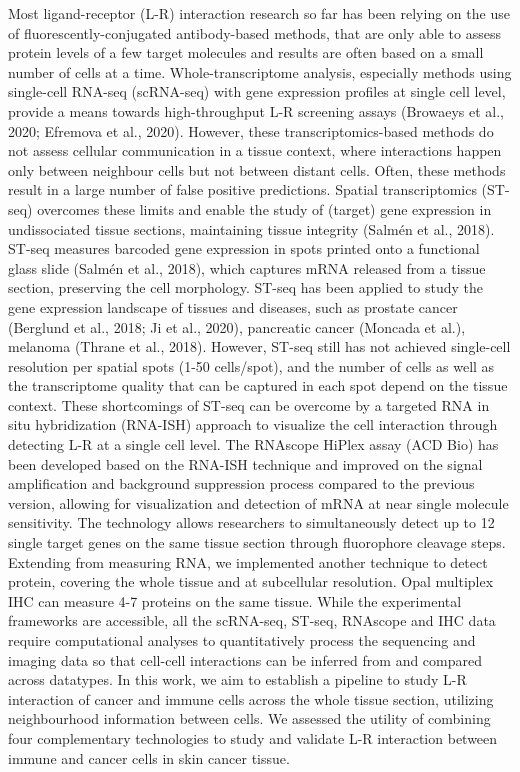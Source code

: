 Most ligand-receptor (L-R) interaction research so far has been relying on the use of fluorescently-conjugated antibody-based methods, that are only able to assess protein levels of a few target molecules and results are often based on a small number of cells at a time. Whole-transcriptome analysis, especially methods using single-cell RNA-seq (scRNA-seq) with gene expression profiles at single cell level, provide a means towards high-throughput L-R screening assays (Browaeys et al., 2020; Efremova et al., 2020). However, these transcriptomics-based methods do not assess cellular communication in a tissue context, where interactions happen only between neighbour cells but not between distant cells. Often, these methods result in a large number of false positive predictions. Spatial transcriptomics (ST-seq) overcomes these limits and enable the study of (target) gene expression in undissociated tissue sections, maintaining tissue integrity (Salmén et al., 2018). ST-seq measures barcoded gene expression in spots printed onto a functional glass slide (Salmén et al., 2018), which captures mRNA released from a tissue section, preserving the cell morphology.  ST-seq has been applied to study the gene expression landscape of tissues and diseases, such as prostate cancer (Berglund et al., 2018; Ji et al., 2020), pancreatic cancer (Moncada et al.), melanoma (Thrane et al., 2018). However, ST-seq still has not achieved single-cell resolution per spatial spots (1-50 cells/spot), and the number of cells as well as the transcriptome quality that can be captured in each spot depend on the tissue context. These shortcomings of ST-seq can be overcome by a targeted RNA in situ hybridization (RNA-ISH) approach to visualize the cell interaction through detecting L-R at a single cell level. The RNAscope HiPlex assay (ACD Bio) has been developed based on the RNA-ISH technique and improved on the signal amplification and background suppression process compared to the previous version, allowing for visualization and detection of mRNA at near single molecule sensitivity. The technology allows researchers to simultaneously detect up to 12 single target genes on the same tissue section through fluorophore cleavage steps. Extending from measuring RNA, we implemented another technique to detect protein, covering the whole tissue and at subcellular resolution. Opal multiplex IHC can measure 4-7 proteins on the same tissue. While the experimental frameworks are accessible, all the scRNA-seq, ST-seq, RNAscope and IHC data require computational analyses to quantitatively process the sequencing and imaging data so that cell-cell interactions can be inferred from and compared across datatypes. 
In this work, we aim to establish a pipeline to study L-R interaction of cancer and immune cells across the whole tissue section, utilizing neighbourhood information between cells. We assessed the utility of combining four complementary technologies to study and validate L-R interaction between immune and cancer cells in skin cancer tissue.

